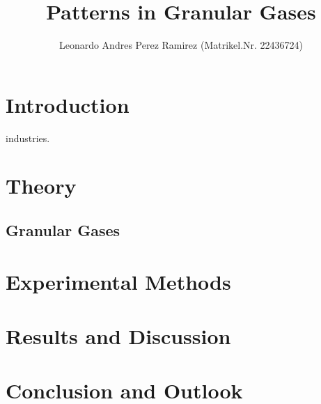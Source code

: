 \documentclass[11pt]{article}
\begin{document}
\title{Patterns in Granular Gases}
	
\author{Leonardo Andres Perez Ramirez (Matrikel.Nr. 22436724)}
\maketitle

\tableofcontents

\newpage
	
\section{Introduction}

industries.\autocite{Frenkel.2015} 


\section{Theory}

\subsection{Granular Gases}


\section{Experimental Methods}


\section{Results and Discussion}


\section{Conclusion and Outlook}


\printbibliography
\end{document}
